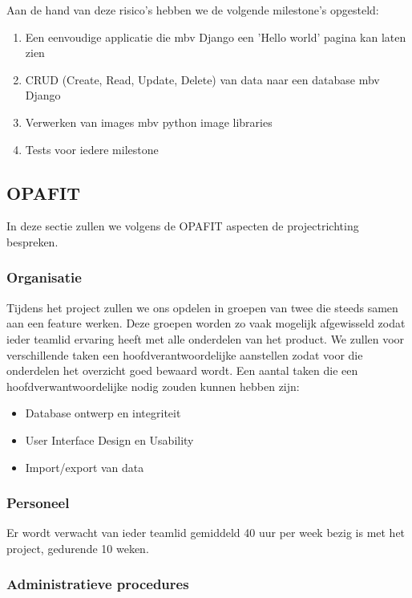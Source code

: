 Aan de hand van deze risico's hebben we de volgende milestone's opgesteld:
\begin{enumerate}
    \item Een eenvoudige applicatie die mbv Django een 'Hello world' pagina kan laten zien
    \item CRUD (Create, Read, Update, Delete) van data naar een database mbv Django
    \item Verwerken van images mbv python image libraries
    \item Tests voor iedere milestone
\end{enumerate}

\subsection{OPAFIT}

In deze sectie zullen we volgens de OPAFIT aspecten de projectrichting bespreken.

\subsubsection{Organisatie}

Tijdens het project zullen we ons opdelen in groepen van twee die steeds samen aan een feature werken.
Deze groepen worden zo vaak mogelijk afgewisseld zodat ieder teamlid ervaring heeft met alle onderdelen van het product.
We zullen voor verschillende taken een hoofdverantwoordelijke aanstellen zodat voor die onderdelen het overzicht goed bewaard wordt.
Een aantal taken die een hoofdverwantwoordelijke nodig zouden kunnen hebben zijn:
\begin{itemize}
    \item Database ontwerp en integriteit
    \item User Interface Design en Usability
    \item Import/export van data
\end{itemize}

\subsubsection{Personeel}

Er wordt verwacht van ieder teamlid gemiddeld 40 uur per week bezig is met het project, gedurende 10 weken.

\subsubsection{Administratieve procedures}

